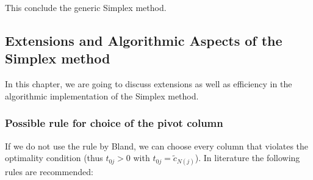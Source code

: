 \documentclass[a4paper]{article}
\numberwithin{lecref}{subsection}
\begin{document}
This conclude the generic Simplex method.

\subsection{Extensions and Algorithmic Aspects of the Simplex method}

In this chapter, we are going to discuss extensions as well as efficiency in the algorithmic implementation of the Simplex method.

\subsubsection{Possible rule for choice of the pivot column}

If we do not use the rule by Bland, we can choose every column that violates the optimality condition (thus $t_{0j} > 0$ with $t_{0j} = \tilde c_{N(j)}$).
In literature the following rules are recommended:
\end{document}
